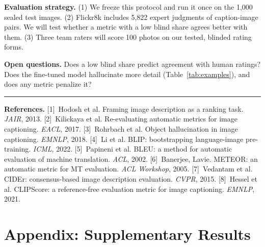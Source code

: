 \documentclass[11pt]{article}
\begin{document}
\textbf{Evaluation strategy.}
(1) We freeze this protocol and run it once on the 1,000 sealed test images.
(2) Flickr8k includes 5,822 expert judgments of caption-image pairs. We will
test whether a metric with a low blind share agrees better with them.
(3) Three team raters will score 100 photos on our tested, blinded rating forms.

\textbf{Open questions.}
Does a low blind share predict agreement with human ratings? Does the fine-tuned model
hallucinate more detail (Table~\ref{tab:examples}), and does any metric penalize it?

\vspace{3pt}\hrule\vspace{3pt}
{\footnotesize\textbf{References.}
[1]~Hodosh et al. Framing image description as a ranking task. \emph{JAIR}, 2013.
[2]~Kilickaya et al. Re-evaluating automatic metrics for image captioning. \emph{EACL}, 2017.
[3]~Rohrbach et al. Object hallucination in image captioning. \emph{EMNLP}, 2018.
[4]~Li et al. BLIP: bootstrapping language-image pre-training. \emph{ICML}, 2022.
[5]~Papineni et al. BLEU: a method for automatic evaluation of machine translation. \emph{ACL}, 2002.
[6]~Banerjee, Lavie. METEOR: an automatic metric for MT evaluation. \emph{ACL Workshop}, 2005.
[7]~Vedantam et al. CIDEr: consensus-based image description evaluation. \emph{CVPR}, 2015.
[8]~Hessel et al. CLIPScore: a reference-free evaluation metric for image captioning. \emph{EMNLP}, 2021.
\par}

\clearpage
\section*{Appendix: Supplementary Results}
\end{document}
